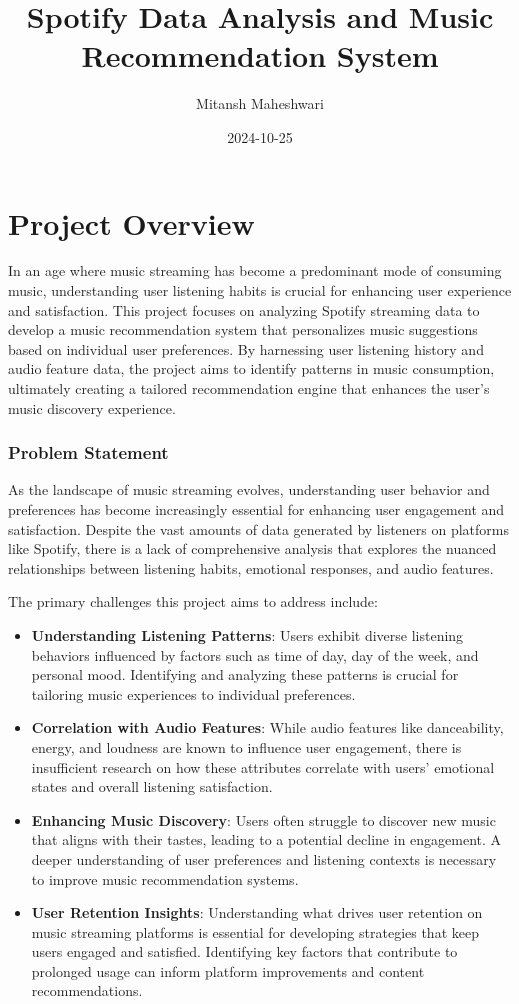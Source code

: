 \documentclass[
]{article}
\title{Spotify Data Analysis and Music Recommendation System}
\author{Mitansh Maheshwari}
\date{2024-10-25}
\begin{document}
\maketitle

\section{Project Overview}\label{project-overview}

In an age where music streaming has become a predominant mode of
consuming music, understanding user listening habits is crucial for
enhancing user experience and satisfaction. This project focuses on
analyzing Spotify streaming data to develop a music recommendation
system that personalizes music suggestions based on individual user
preferences. By harnessing user listening history and audio feature
data, the project aims to identify patterns in music consumption,
ultimately creating a tailored recommendation engine that enhances the
user's music discovery experience.

\subsubsection{Problem Statement}\label{problem-statement}

As the landscape of music streaming evolves, understanding user behavior
and preferences has become increasingly essential for enhancing user
engagement and satisfaction. Despite the vast amounts of data generated
by listeners on platforms like Spotify, there is a lack of comprehensive
analysis that explores the nuanced relationships between listening
habits, emotional responses, and audio features.

The primary challenges this project aims to address include:

\begin{itemize}
\item
  \textbf{Understanding Listening Patterns}: Users exhibit diverse
  listening behaviors influenced by factors such as time of day, day of
  the week, and personal mood. Identifying and analyzing these patterns
  is crucial for tailoring music experiences to individual preferences.
\item
  \textbf{Correlation with Audio Features}: While audio features like
  danceability, energy, and loudness are known to influence user
  engagement, there is insufficient research on how these attributes
  correlate with users' emotional states and overall listening
  satisfaction.
\item
  \textbf{Enhancing Music Discovery}: Users often struggle to discover
  new music that aligns with their tastes, leading to a potential
  decline in engagement. A deeper understanding of user preferences and
  listening contexts is necessary to improve music recommendation
  systems.
\item
  \textbf{User Retention Insights}: Understanding what drives user
  retention on music streaming platforms is essential for developing
  strategies that keep users engaged and satisfied. Identifying key
  factors that contribute to prolonged usage can inform platform
  improvements and content recommendations.
\end{itemize}
\end{document}
